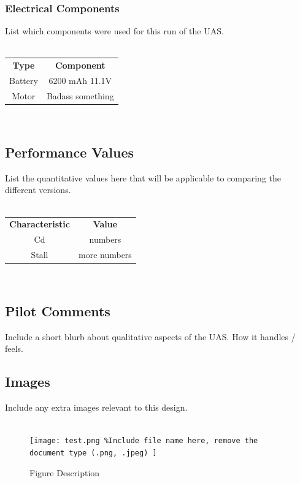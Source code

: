 \documentclass{article}
\begin{document}
\subsubsection*{Electrical Components}
List which components were used for this run of the UAS. \\ \\
\begin{tabular}{ c c }
	\textbf{Type} & \textbf{Component}  \\ 
	Battery & 6200 mAh 11.1V  \\  
	Motor & Badass something
\end{tabular} \\

\subsection*{Performance Values}
List the quantitative values here that will be applicable to comparing the different versions. \\ \\
\begin{tabular}{ c c }
	\textbf{Characteristic} & \textbf{Value}  \\
	Cd & numbers  \\ 
	Stall & more numbers
\end{tabular} \\

\subsection*{Pilot Comments}
Include a short blurb about qualitative aspects of the UAS. How it handles / feels.

\subsection*{Images}
Include any extra images relevant to this design. \\ \\

\begin{figure}[H]
	\texttt{[image: test.png \%Include file name here, remove the document type (.png, .jpeg)
	]}
	\caption{Figure Description}
\end{figure}
\end{document}
